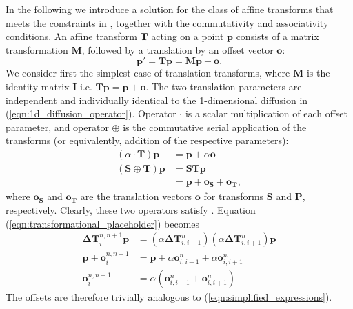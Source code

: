 	  In the following we introduce a solution for the class of affine transforms that meets the constraints in  , together with the commutativity and associativity conditions. An affine transform $\mathbf{T}$ acting on a point $\mathbf{p}$ consists of a matrix transformation $\mathbf{M}$, followed by a translation by an offset vector $\mathbf{o}$:
		\begin{equation}
			\mathbf{p'} = \mathbf{Tp}= \mathbf{Mp} + \mathbf{o}.
		\end{equation}
		We consider first the simplest case of translation transforms, where $\mathbf{M}$ is the identity matrix $\mathbf{I}$ i.e. $\mathbf{Tp} = \mathbf{p} + \mathbf{o}$. The two translation parameters are independent and individually identical to the 1-dimensional diffusion in (\ref{eqn:1d_diffusion_operator}). Operator $\cdot$ is a scalar multiplication of each offset parameter, and operator $\oplus$ is the commutative serial application of the transforms (or equivalently, addition of the respective parameters):
		\begin{align}
			(\alpha \cdot \mathbf{T}) \mathbf{p} &= \mathbf{p} + \alpha\mathbf{o} \label{eqn:translation_cdot}\\
			(\mathbf{S} \oplus \mathbf{T}) \mathbf{p} &= \mathbf{STp} \\
			                                          &= \mathbf{p} + \mathbf{o_S} + \mathbf{o_T} \label{eqn:translation_oplus},
		\end{align}
    where $\mathbf{o_S}$ and $\mathbf{o_T}$ are the translation vectors $\mathbf{o}$ for transforms $\mathbf{S}$ and $\mathbf{P}$, respectively. Clearly, these two operators satisfy . Equation (\ref{eqn:transformational_placeholder}) becomes
		\begin{align}
		 	\mathbf{\Delta T}_i^{n,n+1} \mathbf{p} &= (\alpha \mathbf{\Delta T}_{i,i-1}^n) (\alpha \mathbf{\Delta T}_{i,i+1}^n) \mathbf{p} \\
			\mathbf{p} + \mathbf{o}_i^{n,n+1} &= \mathbf{p} + \alpha \mathbf{o}_{i,i-1}^n + \alpha \mathbf{o}_{i,i+1}^n \\
			\mathbf{o}_i^{n,n+1} &= \alpha (\mathbf{o}_{i,i-1}^n + \mathbf{o}_{i,i+1}^n) 
		\end{align}
		The offsets are therefore trivially analogous to (\ref{eqn:simplified_expressions}).
				
